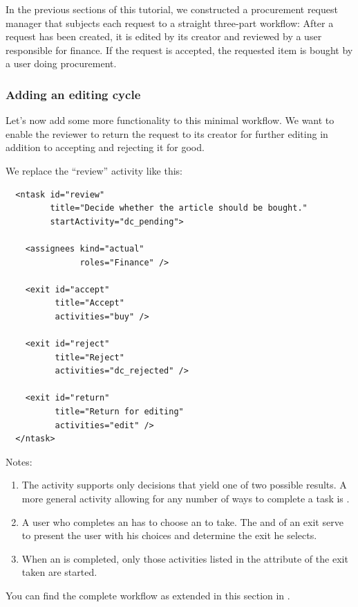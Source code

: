 In the previous sections of this tutorial, we constructed a procurement
request manager that subjects each request to a straight three-part workflow:
After a request has been created, it is edited by its creator and reviewed by
a user responsible for finance. If the request is accepted, the requested item
is bought by a user doing procurement.

\subsubsection{Adding an editing cycle}

Let's now add some more functionality to this minimal workflow. We want to
enable the reviewer to return the request to its creator for further editing
in addition to accepting and rejecting it for good.

We replace the ``review'' activity like this:

\begin{verbatim}
  <ntask id="review"
         title="Decide whether the article should be bought."
         startActivity="dc_pending">

    <assignees kind="actual"
               roles="Finance" />

    <exit id="accept"
          title="Accept"
          activities="buy" />

    <exit id="reject"
          title="Reject"
          activities="dc_rejected" />

    <exit id="return"
          title="Return for editing"
          activities="edit" />
  </ntask>
\end{verbatim}

Notes:
\begin{enumerate}
\item The  activity supports only decisions that yield
  one of two possible results. A more general activity allowing for any number
  of ways to complete a task is .
\item A user who completes an  has to choose an  to
  take. The  and  of an exit serve to present the
  user with his choices and determine the exit he selects.
\item When an  is completed, only those activities listed in the
   attribute of the exit taken are started.
\end{enumerate}

You can find the complete workflow as extended in this section in
.

